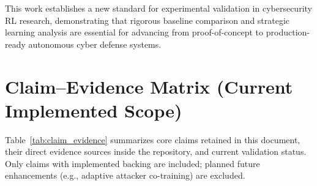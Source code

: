 \documentclass[12pt,oneside]{article}
\begin{document}
This work establishes a new standard for experimental validation in cybersecurity RL research, demonstrating that rigorous baseline comparison and strategic learning analysis are essential for advancing from proof-of-concept to production-ready autonomous cyber defense systems.






\appendix

\section{Claim--Evidence Matrix (Current Implemented Scope)}

Table~\ref{tab:claim_evidence} summarizes core claims retained in this document, their direct evidence sources inside the repository, and current validation status. Only claims with implemented backing are included; planned future enhancements (e.g., adaptive attacker co-training) are excluded.
\end{document}
